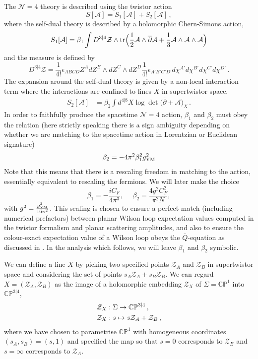 \documentclass[12pt]{article}
\def \be  {\begin{equation}}
\def \ee  {\end{equation}}
\numberwithin{equation}{section}
\begin{document}
The $\mathcal{N}=4$ theory is described using the twistor action 
\be
S[\mathcal{A}] = S_1[\mathcal{A}] + S_2[\mathcal{A}] \,,
\ee
where the self-dual theory is described by a holomorphic Chern-Simons action,
\be
S_1[\mathcal{A}] = \beta_1 \int D^{3|4} \mathcal{Z} \wedge \textrm{tr} \Bigl(\frac{1}{2}\mathcal{A} \wedge \overline{\partial}\mathcal{A} + \frac{1}{3}\mathcal{A} \wedge \mathcal{A} \wedge \mathcal{A}\Bigr)
\ee
and the measure is defined by
\be
D^{3|4}\mathcal{Z} = \frac{1}{4!}\epsilon_{ABCD}Z^A dZ^B \wedge dZ^C \wedge dZ^D \frac{1}{4!} \epsilon_{A'B'C'D'}d\chi^{A'} d\chi^{B'} d\chi^{C'} d\chi^{D'}\,.
\ee
The expansion around the self-dual theory is given by a non-local interaction term where the interactions are confined to lines $X$ in supertwistor space,
\begin{align}
S_2[\mathcal{A}] &= \beta_2 \int d^{4|8} X \log \det\bigl(\overline{\partial} + \mathcal{A} \bigr)_X \,.
\label{logdet}
\end{align}
In order to faithfully produce the spacetime \(\mathcal{N}=4\) action, \(\beta_1\) and \(\beta_2\) must obey the relation (here strictly speaking there is a sign ambiguity depending on whether we are matching to the spacetime action in Lorentzian or Euclidean signature)
\begin{equation}
  \beta_2 = -4\pi^2\beta_1^2g^2_{\rm YM} 
\end{equation}
Note that this means that there is a rescaling freedom in matching to the action, essentially equivalent to rescaling the fermions. We will later make the choice
\begin{equation}
\beta_1 = -\frac{iC_F}{4\pi^3}, \, \, \, \, \, \, \, \, \beta_2 = \frac{4g^2C_F^2}{\pi^2 N},
\end{equation}
with \(g^2 = \frac{g^2_{\rm YM}}{16\pi^2}\). This scaling is chosen to ensure a perfect match (including numerical prefactors) between planar Wilson loop expectation values computed in the twistor formalism and planar scattering amplitudes, and also to ensure the colour-exact expectation value of a Wilson loop obeys the \(\bar{Q}\)-equation as discussed in \cite{Drummond:2026lvq}. In the analysis which follows, we will leave \(\beta_1\) and \(\beta_2\) symbolic. 

We can define a line $X$ by picking two specified points $\mathcal{Z}_A$ and $\mathcal{Z}_B$ in supertwistor space and considering the set of points $s_A \mathcal{Z}_A + s_B \mathcal{Z}_B$. We can regard $X = (\mathcal{Z}_A, \mathcal{Z}_B)$ as the image of a holomorphic embedding $\mathcal{Z}_X$ of $\Sigma = \mathbb{CP}^1$ into $\mathbb{CP}^{3|4}$,
\begin{align}
    &\mathcal{Z}_{X} : \Sigma \rightarrow \mathbb{CP}^{3|4}\,, \notag \\
    &\mathcal{Z}_{X} : s \mapsto s \mathcal{Z}_A + \mathcal{Z}_B\,,
\end{align}
where we have chosen to parametrise $\mathbb{CP}^1$ with homogeneous coordinates $(s_A,s_B) = (s,1)$ and specified the map so that $s=0$ corresponds to $\mathcal{Z}_B$ and $s=\infty$ corresponds to $\mathcal{Z}_A$.
\end{document}

